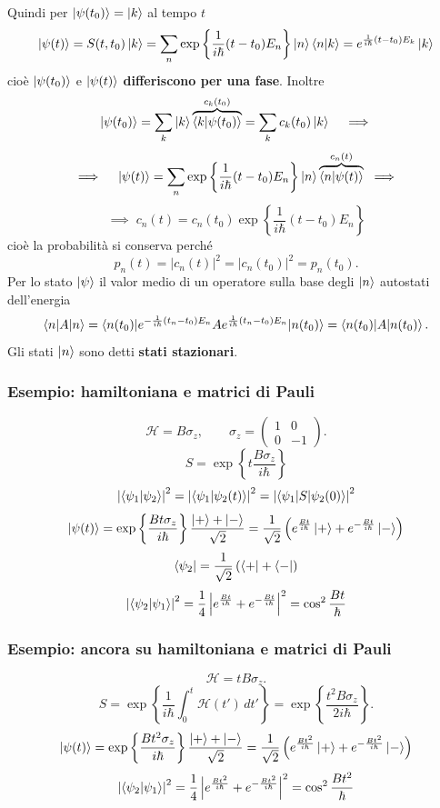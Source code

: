 \bigskip
\noindent
Quindi per \( \ket{\psi(t_0)} = \ket{k} \) al tempo \( t \)
\[
\ket{\psi(t)} = S(t, t_0) \ket{k} = \sum_n \exp{\left\{ \frac{1}{i \hbar} (t - t_0) E_n \right\}} \ket{n} \braket{n|k} = e^{\frac{1}{i \hbar}(t-t_0)E_k}\ket{k}
\]
cioè \( \ket{\psi(t_0)} \) e \( \ket{\psi(t)} \) \textbf{differiscono per una fase}. Inoltre
\[
\ket{\psi(t_0)} = \sum_k \ket{k} \overbrace{\braket{k|\psi(t_0)}}^{c_k(t_0)} = \sum_k c_k(t_0) \ket{k} \quad \implies
\]
\[
\implies \quad \ket{\psi(t)} = \sum_n \exp{\left\{ \frac{1}{i \hbar} (t - t_0) E_n \right\}} \ket{n} \overbrace{\braket{n|\psi(t)}}^{c_n(t)} \; \implies
\]
\[
\implies \; c_n(t) = c_n(t_0) \exp{\left\{ \frac{1}{i \hbar} (t - t_0) E_n \right\}}
\]
cioè la probabilità si conserva perché 
\[
p_n(t) = |c_n(t)|^2 = |c_n(t_0)|^2 = p_n(t_0).
\]
Per lo stato \( \ket{\psi} \) il valor medio di un operatore sulla base degli \( \ket{n} \) autostati dell'energia 
\[
\braket{n|A|n} = \braket{n(t_0)|e^{- \frac{1}{i \hbar} (t_n - t_0) E_n} A e^{\frac{1}{i \hbar} (t_n - t_0) E_n}|n(t_0)} = \braket{n(t_0)|A|n(t_0)}.
\]
Gli stati \( \ket{n} \) sono detti \textbf{stati stazionari}.

\subsubsection{Esempio: hamiltoniana e matrici di Pauli}
\[ \mathcal{H} = B \sigma_z, \qquad \sigma_z = \begin{pmatrix}
1 & 0 \\
0 & -1
\end{pmatrix}.
\]
\[
S = \exp \left\{ t \frac{B \sigma_z}{i\hbar} \right\}
\]
\[
\left| \braket{\psi_1|\psi_2} \right|^2 = \left| \braket{\psi_1|\psi_2(t)} \right|^2 = \left| \braket{\psi_1|S|\psi_2(0)} \right|^2
\]
\[
\ket{\psi(t)} = \exp \left\{ \frac{Bt\sigma_z}{i\hbar} \right\} \frac{\ket{+} + \ket{-}}{\sqrt{2}} = \frac{1}{\sqrt{2}} \left( e^{\frac{Bt}{i\hbar}} \ket{+} + e^{-\frac{Bt}{i\hbar}} \ket{-} \right)
\]
\[
\bra{\psi_2} = \frac{1}{\sqrt{2}} \left( \bra{+} + \bra{-} \right)
\]
\[
\left| \braket{\psi_2|\psi_1} \right|^2 = \frac{1}{4} \left| e^{\frac{Bt}{i\hbar}} + e^{-\frac{Bt}{i\hbar}} \right|^2 = \cos^2 \frac{Bt}{\hbar}
\]

\subsubsection{Esempio: ancora su hamiltoniana e matrici di Pauli}
\[
\mathcal{H} = t B \sigma_z.
\]
\[
S = \exp \left\{ \frac{1}{i\hbar} \int_{0}^t \mathcal{H}(t') \, dt' \right\} = \exp \left\{ \frac{t^2 B \sigma_z}{2i\hbar} \right\}.
\]
\[
\ket{\psi(t)} = \exp \left\{ \frac{Bt^2\sigma_z}{i\hbar} \right\} \frac{\ket{+} + \ket{-}}{\sqrt{2}} = \frac{1}{\sqrt{2}} \left( e^{\frac{Bt^2}{i\hbar}} \ket{+} + e^{-\frac{Bt^2}{i\hbar}} \ket{-} \right)
\]
\[
\left| \braket{\psi_2|\psi_1} \right|^2 = \frac{1}{4} \left| e^{\frac{Bt^2}{i\hbar}} + e^{-\frac{Bt^2}{i\hbar}} \right|^2 = \cos^2 \frac{Bt^2}{\hbar}
\]